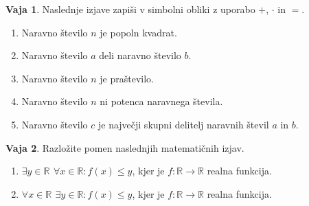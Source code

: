 \documentclass{article}
\theoremstyle{definition}
\newtheorem{vaja}{Vaja}
\begin{document}
\begin{vaja}
Naslednje izjave zapiši v simbolni obliki z uporabo $+$, $\cdot$ in $=$.
 \begin{enumerate}
 \item Naravno število $n$ je popoln kvadrat. %
 \item Naravno število $a$ deli naravno število $b$.  %
 \item Naravno število $n$ je praštevilo. %
  \item Naravno število $n$ ni potenca naravnega števila. %
  \item Naravno število $c$ je največji skupni delitelj naravnih števil $a$ in $b$. %
 
\end{enumerate}
\end{vaja}

\begin{vaja}
Razložite pomen naslednjih matematičnih izjav.
\begin{enumerate}
 \item $\exists y \in \mathbb{R}\,\ \forall x \in \mathbb{R}:  f(x) \leq y$, kjer je $f \colon \mathbb{R} \to \mathbb{R}$ realna funkcija.
 \item $\forall x \in \mathbb{R}\,\ \exists y \in \mathbb{R}:  f(x) \leq y$, kjer je $f \colon \mathbb{R} \to \mathbb{R}$ realna funkcija.
 \end{enumerate}
\end{vaja}
\end{document}
